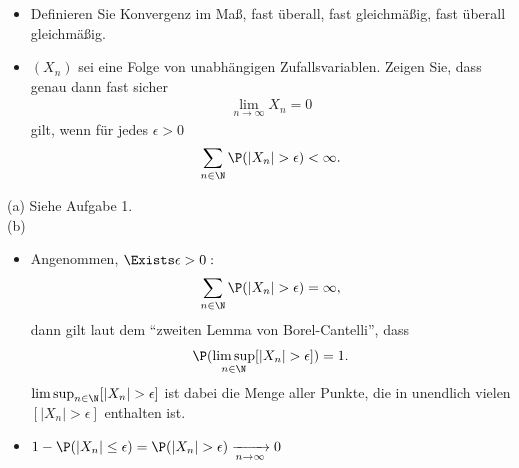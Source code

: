 \begin{exercise}

\phantom{}

\begin{itemize}
  \item[(a)] Definieren Sie Konvergenz im Maß, fast überall, fast gleichmäßig, fast überall gleichmäßig.
  \item[(b)] $(X_n)$ sei eine Folge von unabhängigen Zufallsvariablen. Zeigen Sie, dass genau dann fast sicher
  \begin{align*}
    \lim_{n \to \infty} X_n = 0
  \end{align*}
  gilt, wenn für jedes $\epsilon > 0$
  \begin{align*}
    \sum_{n \in \N} \P(|X_n| > \epsilon) < \infty.
  \end{align*}
\end{itemize}

\end{exercise}


\begin{solution}

(a) Siehe Aufgabe 1. \\

(b) \phantom{}

\begin{itemize}

  \item[\enquote{$\Rightarrow$}:] Angenommen, $\Exists \epsilon > 0:$
  \begin{align*}
    \sum_{n \in \N} \P(|X_n| > \epsilon) = \infty,
  \end{align*}
  dann gilt laut dem \enquote{zweiten Lemma von Borel-Cantelli}, dass
  \begin{align*}
    \P(\limsup_{n \in \N} [|X_n| > \epsilon]) = 1.
  \end{align*}
  $\limsup_{n \in \N} [|X_n| > \epsilon]$ ist dabei die Menge aller Punkte, die in unendlich vielen $[|X_n| > \epsilon]$ enthalten ist.

  \item[\enquote{$\Leftarrow$}:]
  $1 - \P(|X_n| \leq \epsilon)
  =
  \P(|X_n| > \epsilon)
  \xrightarrow[n \to \infty]{} 0$

\end{itemize}

\end{solution}

